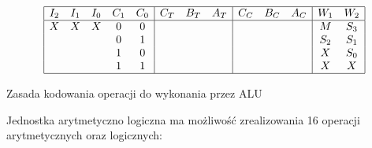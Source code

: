 \documentclass[../main.tex]{subfiles}
\begin{document}
        \begin{table}[ht]
            \[
            \begin{array}{|ccccc|ccc|ccc|cc|}
            \hline
            I_2 & I_1 & I_0 & C_1 & C_0 & C_T & B_T & A_T & C_C & B_C & A_C & W_1 & W_2 \\ \hline
            X & X & X & 0 & 0 &   &   &   &   &   &   & M & S_3 \\ 
            &   &   & 0 & 1 &   &   &   &   &   &   & S_2 & S_1 \\
            &   &   & 1 & 0 &   &   &   &   &   &   & X & S_0 \\
            &   &   & 1 & 1 &   &   &   &   &   &   & X & X \\ \hline
            \end{array}
            \]
            \caption{Zasada kodowania operacji do wykonania przez ALU}
            \label{tab:kodowanie_alu}
        \end{table}

        Jednostka arytmetyczno logiczna ma możliwość zrealizowania 16 operacji arytmetycznych oraz logicznych:
        
\end{document}
